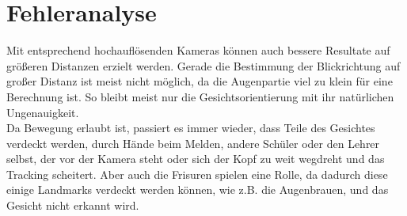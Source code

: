 \section{Fehleranalyse}
Mit entsprechend hochauflösenden Kameras können auch bessere Resultate auf größeren Distanzen erzielt werden. Gerade die Bestimmung der Blickrichtung auf großer Distanz ist meist nicht möglich, da die Augenpartie viel zu klein für eine Berechnung ist. So bleibt meist nur die Gesichtsorientierung mit ihr natürlichen Ungenauigkeit.\\
Da Bewegung erlaubt ist, passiert es immer wieder, dass Teile des Gesichtes verdeckt werden, durch Hände beim Melden, andere Schüler oder den Lehrer selbst, der vor der Kamera steht oder sich der Kopf zu weit wegdreht und das Tracking scheitert. Aber auch die Frisuren spielen eine Rolle, da dadurch diese einige Landmarks verdeckt werden können, wie z.B. die Augenbrauen, und das Gesicht nicht erkannt wird.